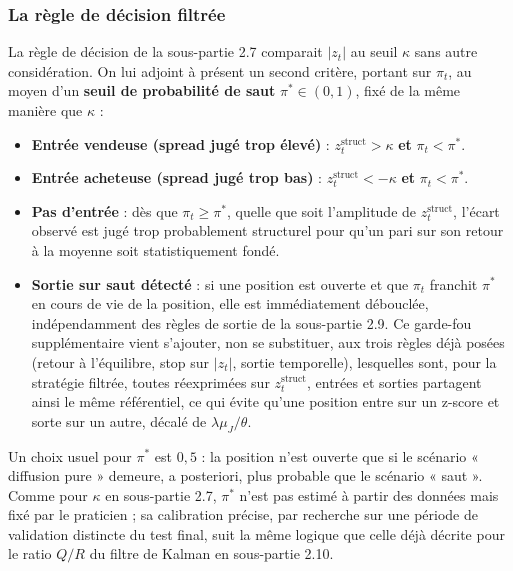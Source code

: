 \documentclass{article}
\begin{document}
\subsubsection*{La règle de décision filtrée}
La règle de décision de la sous-partie 2.7 comparait $|z_t|$ au seuil $\kappa$ sans autre considération. On lui adjoint à présent un second critère, portant sur $\pi_t$, au moyen d'un \textbf{seuil de probabilité de saut} $\pi^\ast\in(0,1)$, fixé de la même manière que $\kappa$ :
\begin{itemize}
\item \textbf{Entrée vendeuse (spread jugé trop élevé)} : $z_t^{\text{struct}} > \kappa$ \textbf{et} $\pi_t < \pi^\ast$.
\item \textbf{Entrée acheteuse (spread jugé trop bas)} : $z_t^{\text{struct}} < -\kappa$ \textbf{et} $\pi_t < \pi^\ast$.
\item \textbf{Pas d'entrée} : dès que $\pi_t \geq \pi^\ast$, quelle que soit l'amplitude de $z_t^{\text{struct}}$, l'écart observé est jugé trop probablement structurel pour qu'un pari sur son retour à la moyenne soit statistiquement fondé.
\item \textbf{Sortie sur saut détecté} : si une position est ouverte et que $\pi_t$ franchit $\pi^\ast$ en cours de vie de la position, elle est immédiatement débouclée, indépendamment des règles de sortie de la sous-partie 2.9. Ce garde-fou supplémentaire vient s'ajouter, non se substituer, aux trois règles déjà posées (retour à l'équilibre, stop sur $|z_t|$, sortie temporelle), lesquelles sont, pour la stratégie filtrée, toutes réexprimées sur $z_t^{\text{struct}}$, entrées et sorties partagent ainsi le même référentiel, ce qui évite qu'une position entre sur un z-score et sorte sur un autre, décalé de $\lambda\mu_J/\theta$.
\end{itemize}
Un choix usuel pour $\pi^\ast$ est $0{,}5$ : la position n'est ouverte que si le scénario « diffusion pure » demeure, a posteriori, plus probable que le scénario « saut ». Comme pour $\kappa$ en sous-partie 2.7, $\pi^\ast$ n'est pas estimé à partir des données mais fixé par le praticien ; sa calibration précise, par recherche sur une période de validation distincte du test final, suit la même logique que celle déjà décrite pour le ratio $Q/R$ du filtre de Kalman en sous-partie 2.10.
\end{document}
